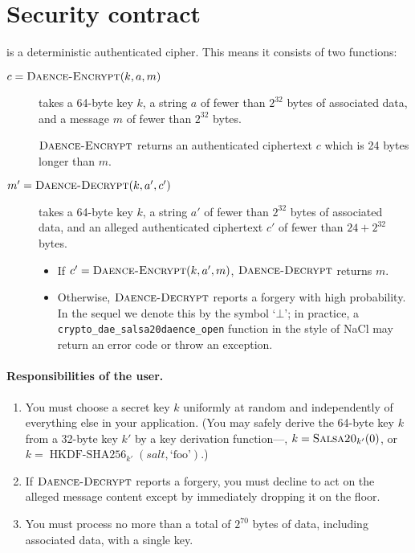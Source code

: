 \documentclass{article}
\def\operatorsc#1{{%
  \ifmmode\let\next=\operatorname\else\let\next=\relax\fi\next{\textsc{#1}}}}
\def\Salsa#1/{\operatorsc{Salsa#1}}
\def\DAENCE/{\operatorsc{Daence}}
\def\NaCl/{NaCl}
\DeclareMathOperator{\DaenceEncrypt}{\textsc{Daence-Encrypt}}
\DeclareMathOperator{\DaenceDecrypt}{\textsc{Daence-Decrypt}}
\begin{document}
\section{Security contract}

\DAENCE/ is a deterministic authenticated cipher.
This means it consists of two functions:
%
\begin{description}
  \item[\normalfont $c = \DaenceEncrypt(k, a, m)$] takes a 64-byte key
     $k$, a string $a$ of fewer than $2^{32}$ bytes of associated
     data, and a message $m$ of fewer than $2^{32}$ bytes.

    $\DaenceEncrypt$ returns an authenticated ciphertext $c$ which is
     24 bytes longer than $m$.

  \item[\normalfont $m' = \DaenceDecrypt(k, a', c')$] takes a 64-byte
     key $k$, a string $a'$ of fewer than $2^{32}$ bytes of associated
     data, and an alleged authenticated ciphertext $c'$ of fewer than
     $24 + 2^{32}$ bytes.

    \begin{itemize}
      \item If $c' = \DaenceEncrypt(k, a', m)$, $\DaenceDecrypt$
         returns $m$.
      \item Otherwise, $\DaenceDecrypt$ reports a forgery with high
         probability.
        In the sequel we denote this by the symbol `$\bot$'; in
         practice, a \texttt{crypto\_dae\_salsa20daence\_open}
         function in the style of \NaCl/ may return an error code or
         throw an exception.
    \end{itemize}
\end{description}

\paragraph*{Responsibilities of the user.}

\begin{enumerate}
  \item You must choose a secret key $k$ uniformly at random and
     independently of everything else in your application.
    (You may safely derive the 64-byte key $k$ from a 32-byte key $k'$
     by a key derivation function---\eg, $k = \Salsa20/_{k'}(0)$, or
     $k = \operatorname{HKDF-SHA256}_{k'}(\mathit{salt}, \text{`foo'})$.)

  \item If $\DaenceDecrypt$ reports a forgery, you must decline to act
     on the alleged message content except by immediately dropping it
     on the floor.

  \item You must process no more than a total of $2^{70}$ bytes of
     data, including associated data, with a single key.
\end{enumerate}
\end{document}
